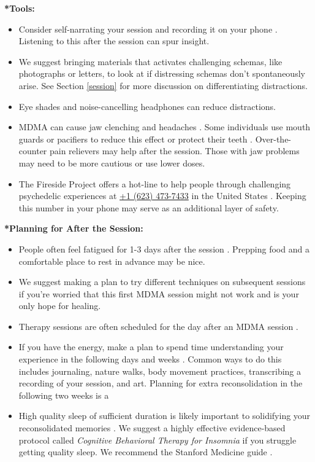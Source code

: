\documentclass[12pt,letterpaper]{book}
\begin{document}
\noindent \textbf{*Tools:}
\begin{itemize}
    \item Consider self-narrating your session and recording it on your phone \cite{mithoeferManual}. Listening to this after the session can spur insight.
    \item We suggest bringing materials that activates challenging schemas, like photographs or letters, to look at if distressing schemas don't spontaneously arise. See Section \ref{session} for more discussion on differentiating distractions.
    \item Eye shades and noise-cancelling headphones can reduce distractions.
    \item MDMA can cause jaw clenching and headaches \cite{mitchellMDMAClinicalTrial2,liechtiGender}. Some individuals use mouth guards or pacifiers to reduce this effect or protect their teeth \cite{emdeEmergency}. Over-the-counter pain relievers may help after the session. Those with jaw problems may need to be more cautious or use lower doses. 
    \item The Fireside Project offers a hot-line to help people through challenging psychedelic experiences at \href{tel:1-623-473-7433}{+1 (623) 473-7433} in the United States \cite{firesideProject}. Keeping this number in your phone may serve as an additional layer of safety.
\end{itemize}
\noindent \textbf{*Planning for After the Session:}
\begin{itemize}
    \item People often feel fatigued for 1-3 days after the session \cite{liechtiGender}. Prepping food and a comfortable place to rest in advance may be nice.
    \item We suggest making a plan to try different techniques on subsequent sessions if you're worried that this first MDMA session might not work and is your only hope for healing.
    \item Therapy sessions are often scheduled for the day after an MDMA session \cite{mithoeferManual}. 
    \item If you have the energy, make a plan to spend time understanding your experience in the following days and weeks \cite{mithoeferManual}. Common ways to do this includes journaling, nature walks, body movement practices, transcribing a recording of your session, and art. Planning for extra reconsolidation in the following two weeks is a
    \item High quality sleep of sufficient duration is likely important to solidifying your reconsolidated memories \cite{simon2020sleep}. We suggest a highly effective evidence-based protocol called \textit{Cognitive Behavioral Therapy for Insomnia} if you struggle getting quality sleep. We recommend the Stanford Medicine guide \cite{stanfordSleep}.
\end{itemize}
\end{document}
